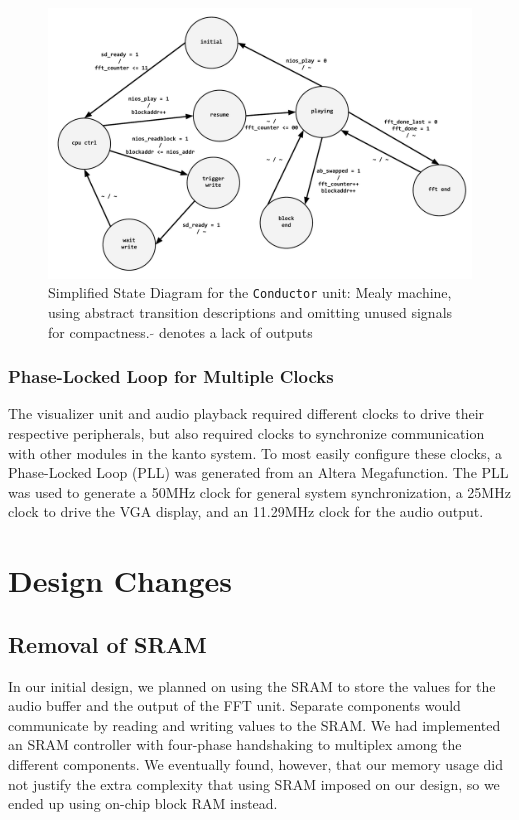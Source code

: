 \documentclass{article}
\begin{document}
\begin{figure}[H]
  \centering
    \includegraphics[width=6in]{conductor_state}
  \caption{Simplified State Diagram for the \texttt{Conductor} unit:
    Mealy machine, using abstract transition descriptions and omitting unused
    signals for compactness. \(\widetilde{}\)   denotes a lack of outputs}
\end{figure}
\subsubsection{Phase-Locked Loop for Multiple Clocks}
The visualizer unit and audio playback required different clocks to drive their respective peripherals, but also required clocks to synchronize communication with other modules in the kanto system. To most easily configure these clocks, a Phase-Locked Loop (PLL) was generated from an Altera Megafunction. The PLL was used to generate a 50MHz clock for general system synchronization, a 25MHz clock to drive the VGA display, and an 11.29MHz clock for the audio output.

\section{Design Changes}
\subsection{Removal of SRAM}

In our initial design, we planned on using the SRAM to store the values for the audio 
buffer and the output of the FFT unit. Separate components would communicate by 
reading and writing values to the SRAM. We had implemented an SRAM controller 
with four-phase handshaking to multiplex among the different components. We 
eventually found, however, that our memory usage did not justify the extra complexity 
that using SRAM imposed on our design, so we ended up using on-chip block RAM 
instead.
\end{document}
